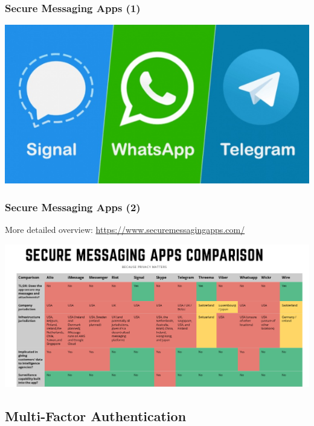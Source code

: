 \documentclass[aspectratio=1610,dvipsnames]{beamer}
\begin{document}
\begin{frame}
\frametitle{Secure Messaging Apps (1)}
\begin{center}
\includegraphics[scale=0.5]{images/signal_whatsapp_telegram.png} 
\end{center}
\end{frame}

\begin{frame}
\frametitle{Secure Messaging Apps (2)}
\begin{center}
More detailed overview: \url{https://www.securemessagingapps.com/}
\bigskip

\includegraphics[scale=0.25, keepaspectratio]{images/secure_messengers_comparison.png} 
\end{center}
\end{frame}

\subsection{Multi-Factor Authentication}
\end{document}
